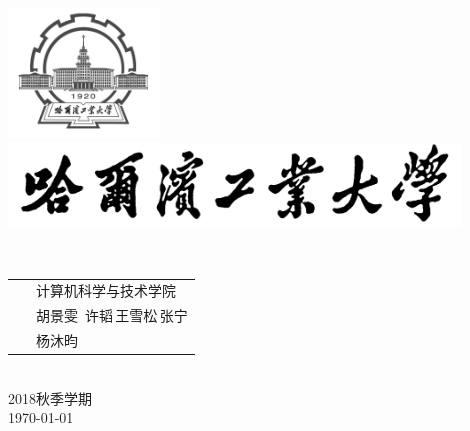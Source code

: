 \documentclass[a4paper,12pt]{report}
\begin{document}
\begin{titlepage}
	\begin{center}
    \includegraphics[width=0.3\textwidth]{figure//sf1.png}\\
		
    \includegraphics[width=0.9\textwidth]{figure//sf.jpg}\\

    \vspace{10mm}

    \textbf{}\\[3cm]

	\vspace{\fill}
	
\setlength{\extrarowheight}{3mm}
{\songti{}	


\begin{tabular}{rl}
	
	{\makebox[4\ccwd][s]{学\qquad 院：}}& ~\kaishu 计算机科学与技术学院\\
	
	{\makebox[4\ccwd][s]{姓\qquad 名：}}& ~\kaishu 胡景雯 \,许韬\,王雪松\,张宁 \\

	{\makebox[4\ccwd][s]{指导老师：}} & ~\kaishu 杨沐昀\\

\end{tabular}
 }\\[2cm]

\vspace{\fill}
2018秋季学期\\
\today
	\end{center}	
\end{titlepage}
\end{document}
